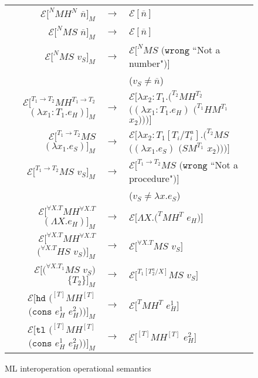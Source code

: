 \begin{figure}[p]
\label{mios}
\caption{ML interoperation operational semantics}
\begin{center}
\begin{tabular}{rcl}
$\mathscr{E}[^{N}MH^{N}$ $\overline{n}]_{M}$ & $\rightarrow$ & $\mathscr{E}[\overline{n}]$ \\
$\mathscr{E}[^{N}MS$ $\overline{n}]_{M}$ & $\rightarrow$ & $\mathscr{E}[\overline{n}]$ \\
$\mathscr{E}[^{N}MS$ $v_{S}]_{M}$ & $\rightarrow$ & $\mathscr{E}[^{N}MS$ $(\mathtt{wrong}$ ``Not a number"$)]$ \\
&& ($v_{S}\neq\overline{n}$) \\
$\mathscr{E}[^{T_{1}\rightarrow T_{2}}MH^{T_{1}\rightarrow T_{2}}$ $(\lambda x_{1}:T_{1}.e_{H})]_{M}$ & $\rightarrow$ & $\mathscr{E}[\lambda x_{2}:T_{1}.(^{T_{2}}MH^{T_{2}}$ $((\lambda x_{1}:T_{1}.e_{H})$ $(^{T_{1}}HM^{T_{1}}$ $x_{2})))]$ \\
$\mathscr{E}[^{T_{1}\rightarrow T_{2}}MS$ $(\lambda x_{1}.e_{S})]_{M}$ & $\rightarrow$ & $\mathscr{E}[\lambda x_{2}:T_{1}[T_{i}/T^{a}_{i}].(^{T_{2}}MS$ $((\lambda x_{1}.e_{S})$ $(SM^{T_{1}}$ $x_{2})))]$ \\
$\mathscr{E}[^{T_{1}\rightarrow T_{2}}MS$ $v_{S}]_{M}$ & $\rightarrow$ & $\mathscr{E}[^{T_{1}\rightarrow T_{2}}MS$ $(\mathtt{wrong}$ ``Not a procedure"$)]$ \\
&& ($v_{S}\neq\lambda x.e_{S}$) \\
$\mathscr{E}[^{\forall X.T}MH^{\forall X.T}$ $(\Lambda X.e_{H})]_{M}$ & $\rightarrow$ & $\mathscr{E}[\Lambda X.(^{T}MH^{T}$ $e_{H})]$ \\
$\mathscr{E}[^{\forall X.T}MH^{\forall X.T}$ $(^{\forall X.T}HS$ $v_{S})]_{M}$ & $\rightarrow$ & $\mathscr{E}[^{\forall X.T}MS$ $v_{S}]$ \\
$\mathscr{E}[(^{\forall X.T_{1}}MS$ $v_{S})$ $\lbrace T_{2}\rbrace]_{M}$ & $\rightarrow$ & $\mathscr{E}[^{T_{1}[T^{a}_{2}/X]}MS$ $v_{S}]$ \\
$\mathscr{E}[\mathtt{hd}$ $(^{[T]}MH^{[T]}$ $(\mathtt{cons}$ $e_{H}^{1}$ $e_{H}^{2}))]_{M}$ & $\rightarrow$ & $\mathscr{E}[^{T}MH^{T}$ $e_{H}^{1}]$ \\
$\mathscr{E}[\mathtt{tl}$ $(^{[T]}MH^{[T]}$ $(\mathtt{cons}$ $e_{H}^{1}$ $e_{H}^{2}))]_{M}$ & $\rightarrow$ & $\mathscr{E}[^{[T]}MH^{[T]}$ $e_{H}^{2}]$ \\

\end{tabular}
\end{center}
\end{figure}
